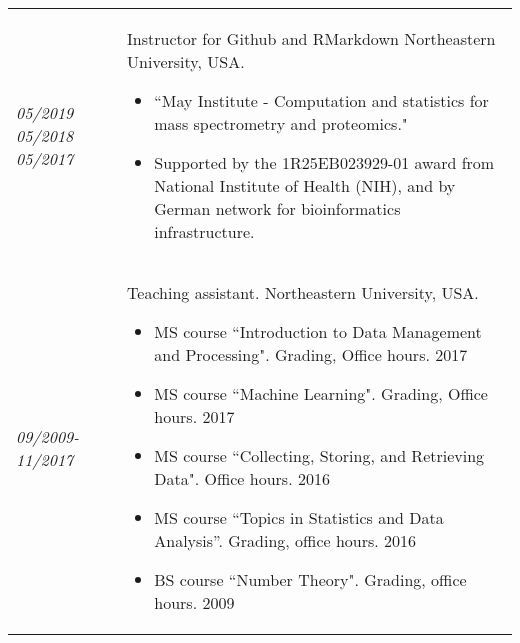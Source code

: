 \documentclass[11pt]{article}
\newcommand{\place}[1]{{\sc #1}}
\newcommand{\entry}[2]{{\emph{#1}}&{ #2 }\\[0.22cm]}
\begin{document}
\begin{longtable}{@{}p{1.5cm}p{14.5cm}}
\entry{05/2019 05/2018 05/2017}{Instructor for Github and RMarkdown \place{Northeastern University}, USA. 
\begin{itemize} 
\vspace{-0.25cm}
   \item ``May Institute - Computation and statistics for mass spectrometry and proteomics."
   \item Supported by the 1R25EB023929-01 award from National Institute of Health (NIH), and by German network for bioinformatics infrastructure.
   \end{itemize}
   \vspace{-0.25cm}
}   
\entry{09/2009-11/2017}{Teaching assistant. \place{Northeastern University}, USA. 
\begin{itemize} 
\vspace{-0.25cm}
   \item MS course ``Introduction to Data Management and Processing". Grading, Office hours. 2017
   \vspace{-0.25cm}
   \item MS course ``Machine Learning". Grading, Office hours. 2017
   \vspace{-0.25cm}
   \item MS course ``Collecting, Storing, and Retrieving Data". Office hours. 2016
   \vspace{-0.25cm}
  \item  MS course ``Topics in Statistics and Data Analysis''. Grading, office hours. 2016
     \vspace{-0.25cm}
   \item  BS course ``Number Theory". Grading, office hours. 2009
   \end{itemize}

}





\end{longtable}
\end{document}
